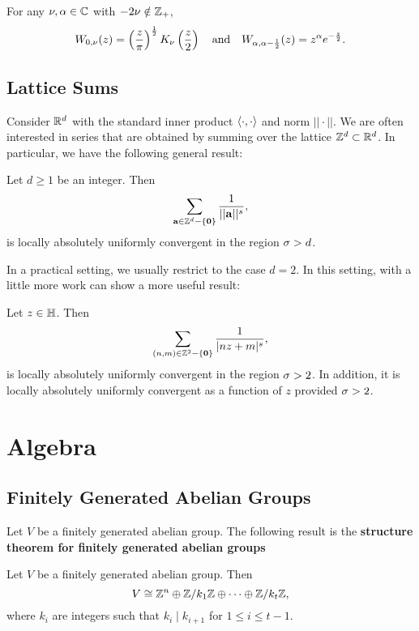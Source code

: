     \begin{theorem}\label{thm:Whittaker_special_cases}
      For any $\nu,\alpha \in \mathbb{C}$ with $-2\nu \notin \mathbb{Z}_{+}$,
      \[
        W_{0,\nu}(z) = \left(\frac{z}{\pi}\right)^{\frac{1}{2}}K_{\nu}\left(\frac{z}{2}\right) \quad \text{and} \quad W_{\alpha,\alpha-\frac{1}{2}}(z) = z^{\alpha}e^{-\frac{z}{2}}.
      \]
    \end{theorem}
  \section{Lattice Sums}
    Consider $\mathbb{R}^{d}$ with the standard inner product $\langle\cdot,\cdot\rangle$ and norm $||\cdot||$. We are often interested in series that are obtained by summing over the lattice $\mathbb{Z}^{d} \subset \mathbb{R}^{d}$. In particular, we have the following general result:

    \begin{theorem}
      Let $d \ge 1$ be an integer. Then
      \[
        \sum_{\mathbf{a} \in \mathbb{Z}^{d}-\{\mathbf{0}\}}\frac{1}{||\mathbf{a}||^{s}},
      \]
      is locally absolutely uniformly convergent in the region $\sigma > d$.
    \end{theorem}

    In a practical setting, we usually restrict to the case $d = 2$. In this setting, with a little more work can show a more useful result:

    \begin{proposition}\label{prop:general_lattice_sum_convergence_for_two_variables}
      Let $z \in \mathbb{H}$. Then
      \[
        \sum_{(n,m) \in \mathbb{Z}^{2}-\{\mathbf{0}\}}\frac{1}{|nz+m|^{s}},
      \]
      is locally absolutely uniformly convergent in the region $\sigma > 2$. In addition, it is locally absolutely uniformly convergent as a function of $z$ provided $\sigma > 2$.
    \end{proposition}
\chapter{Algebra}
  \section{Finitely Generated Abelian Groups}
    Let $V$ be a finitely generated abelian group. The following result is the \textbf{structure theorem for finitely generated abelian groups}

    \begin{theorem}
      Let $V$ be a finitely generated abelian group. Then
      \[
        V \cong \mathbb{Z}^{n} \oplus \mathbb{Z}/k_{1}\mathbb{Z} \oplus \cdots \oplus \mathbb{Z}/k_{t}\mathbb{Z},
      \]
      where $k_{i}$ are integers such that $k_{i} \mid k_{i+1}$ for $1 \le i \le t-1$.
    \end{theorem}

